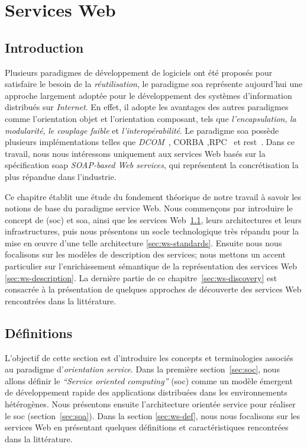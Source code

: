 \chapter{Services Web}
\label{ch:web-service}

\section*{Introduction}
 

Plusieurs paradigmes de développement de logiciels ont été proposés
pour satisfaire le besoin de la \textit{réutilisation}, le paradigme
\acrshort{soa} représente aujourd'hui une approche largement adoptée
pour le développement des systèmes d'information distribués sur
\textit{Internet}. En effet, il adopte les avantages des autres
paradigmes comme l'orientation objet et l'orientation composant, tels
que \textit{l'encapsulation}, \textit{la modularité}, \textit{le
  couplage faible} et \textit{l'interopérabilité}. Le paradigme
\acrshort{soa} possède plusieurs implémentations telles que
\textit{DCOM}~\cite{frank1997dcom}, \textsc{CORBA}
\cite{vinoski1997corba},\textsc{RPC}~\cite{bloomer1992power} et
\acrshort{rest}~\cite{fielding2000architectural}. Dans ce travail,
nous nous intéressons uniquement aux services Web basés sur la
spécification \acrshort{soap} \textit{SOAP-based Web services}, qui
représentent la concrétisation la plus répandue dans
l'industrie.\bigskip

Ce chapitre établit une étude du fondement théorique de notre travail
à savoir les notions de base du paradigme service Web. Nous commençons
par introduire le concept de (\acrshort{soc}) et \acrshort{soa}, ainsi
que les services Web~\ref{sec:ws-definitions}, leurs architectures et
leurs infrastructures, puis nous présentons un socle technologique
très répandu pour la mise en œuvre d'une telle architecture
\ref{sec:ws-standards}. Ensuite nous nous focalisons sur les modèles
de description des services; nous mettons un accent particulier sur
l'enrichissement sémantique de la représentation des services Web
\ref{sec:ws-description}. La dernière partie de ce
chapitre~\ref{sec:ws-discovery} est consacrée à la présentation de
quelques approches de découverte des services Web rencontrées dans la
littérature.

\newpage
\section{Définitions}
\label{sec:ws-definitions}
L'objectif de cette section est d'introduire les concepts et
terminologies associés au paradigme d'\textit{orientation
  service}. Dans la première section~\ref{sec:soc}, nous allons
définir le \textit{``Service oriented computing''} (\acrshort{soc})
comme un modèle émergent de développement rapide des applications
distribuées dans les environnements hétérogènes. Nous présentons
ensuite l'architecture orientée service pour réaliser le
\acrshort{soc} (section~\ref{sec:soa}). Dans la section
\ref{sec:ws-def}, nous nous focalisons sur les services Web en
présentant quelques définitions et caractéristiques rencontrées dans
la littérature.
